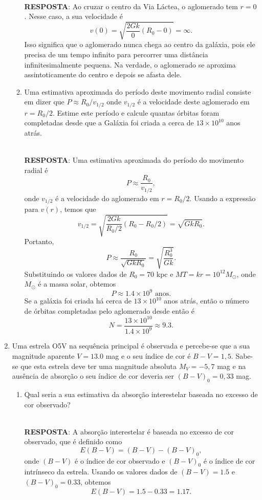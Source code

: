 \documentclass[a4paper,12pt]{article}
\begin{document}
\begin{enumerate}
\begin{enumerate}
\noindent\hrulefill\\\textbf{RESPOSTA}: Ao cruzar o centro da Via Láctea, o aglomerado tem $r=0$. Nesse caso, a sua velocidade é
$$ v(0) = \sqrt{\frac{2Gk}{0}(R_0 - 0)} = \infty. $$
Isso significa que o aglomerado nunca chega ao centro da galáxia, pois ele precisa de um tempo infinito para percorrer uma distância infinitesimalmente pequena. Na verdade, o aglomerado se aproxima assintoticamente do centro e depois se afasta dele.

\noindent\hrulefill

\item Uma estimativa aproximada do período deste movimento radial consiste em dizer que $P \approx R_0/v_{1/2}$ onde $v_{1/2}$ é a velocidade deste aglomerado em $r=R_0/2$. Estime este período e calcule quantas órbitas foram completadas desde que a Galáxia foi criada a cerca de $13\times 10^{10}$ anos atrás.

\noindent\hrulefill\\\textbf{RESPOSTA}: Uma estimativa aproximada do período do movimento radial é
$$ P \approx \frac{R_0}{v_{1/2}}, $$
onde $v_{1/2}$ é a velocidade do aglomerado em $r=R_0/2$. Usando a expressão para $v(r)$, temos que
$$ v_{1/2} = \sqrt{\frac{2Gk}{R_0/2}(R_0 - R_0/2)} = \sqrt{GkR_0}. $$
Portanto,
$$ P \approx \frac{R_0}{\sqrt{GkR_0}} = \sqrt{\frac{R_0^3}{Gk}}. $$
Substituindo os valores dados de $R_0=70$ kpc e $MT=kr=10^{12} M_\odot$, onde $M_\odot$ é a massa solar, obtemos
$$ P \approx 1.4 \times 10^9 \text{ anos}. $$
Se a galáxia foi criada há cerca de $13\times 10^{10}$ anos atrás, então o número de órbitas completadas pelo aglomerado desde então é
$$ N = \frac{13\times 10^{10}}{1.4\times 10^9} \approx 9.3. $$

\end{enumerate}

\noindent\hrulefill

\item Uma estrela O5V na sequência principal é observada e percebe-se que a sua magnitude aparente $V= 13.0$ mag e o seu índice de cor é $B-V= 1,5$. Sabe-se que esta estrela deve ter uma magnitude absoluta $M_V =-5,7$ mag e na ausência de absorção o seu índice de cor deveria ser $(B-V)_0=0,33$ mag.

\begin{enumerate}
\item Qual seria a sua estimativa da absorção interestelar baseada no excesso de cor observado?

\noindent\hrulefill\\\textbf{RESPOSTA}: A absorção interestelar é baseada no excesso de cor observado, que é definido como
$$ E(B-V) = (B-V) - (B-V)_0, $$
onde $(B-V)$ é o índice de cor observado e $(B-V)_0$ é o índice de cor intrínseco da estrela. Usando os valores dados de $(B-V) = 1.5$ e $(B-V)_0 = 0.33$, obtemos
$$ E(B-V) = 1.5 - 0.33 = 1.17. $$


\end{enumerate}
\end{enumerate}
\end{document}
